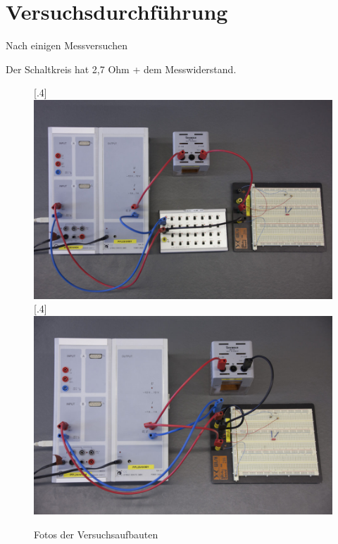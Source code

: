 \section{Versuchsdurchführung}
Nach einigen Messversuchen


Der Schaltkreis hat 2,7 Ohm + dem Messwiderstand.



\begin{figure}
\centering
    [.4\linewidth]
            {\includegraphics[width=.4\textwidth]{images/durchlassfilter.jpg}}
    [.4\linewidth]
            {\includegraphics[width=.4\textwidth]{images/sperrfilter.jpg}}
\caption{Fotos der Versuchsaufbauten}
\end{figure}

